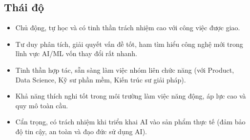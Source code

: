 \subsection{Thái độ}
\begin{itemize}
    \item Chủ động, tự học và có tinh thần trách nhiệm cao với công việc được giao.
    \item Tư duy phân tích, giải quyết vấn đề tốt, ham tìm hiểu công nghệ mới trong lĩnh vực AI/ML vốn thay đổi rất nhanh.
    \item Tinh thần hợp tác, sẵn sàng làm việc nhóm liên chức năng (với Product, Data Science, Kỹ sư phần mềm, Kiến trúc sư giải pháp).
    \item Khả năng thích nghi tốt trong môi trường làm việc năng động, áp lực cao và quy mô toàn cầu.
    \item Cẩn trọng, có trách nhiệm khi triển khai AI vào sản phẩm thực tế (đảm bảo độ tin cậy, an toàn và đạo đức sử dụng AI).
\end{itemize}
